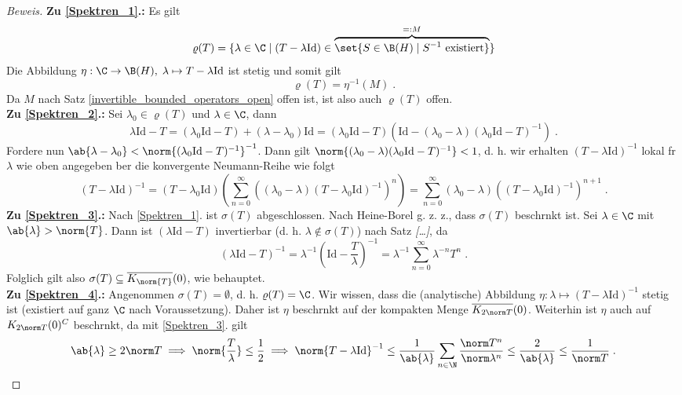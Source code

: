 	\begin{proof}[Beweis]
		\textbf{Zu \ref{Spektren_1}.:} Es gilt
		\[\varrho(T) = \{\lambda \in \C\;\vert\; (T-\lambda \text{Id}) \in \overbrace{\set{S \in \B(H)\;\vert\;S^{-1} \text{ existiert}}}^{=:M}\} \]
		Die Abbildung \(\eta:\C \to \B(H),\; \lambda \mapsto T-\lambda \text{Id}\) ist stetig und somit gilt 
		\[\varrho(T) = \eta^{-1}(M)\;.\]
		Da $M$ nach Satz \ref{invertible_bounded_operators_open} offen ist, ist also auch \(\varrho(T)\) offen.\\
		\textbf{Zu \ref{Spektren_2}.:} Sei \(\lambda_0 \in \varrho(T)\) und \(\lambda \in \C\), dann  
		\[\lambda\text{Id} - T = (\lambda_0\text{Id} -T) + (\lambda - \lambda_0)\text{Id} = (\lambda_0\text{Id}-T)(\text{Id} - (\lambda_0 - \lambda)(\lambda_0 \text{Id}-T)^{-1})\;.\]
		Fordere nun  \(\ab{\lambda - \lambda_0} < \norm{(\lambda_0\text{Id} -T)^{-1}}^{-1}\). Dann gilt \(\norm{(\lambda_0 - \lambda)(\lambda_0\text{Id}-T)^{-1}}< 1\), d. h. wir erhalten \((T-\lambda\text{Id})^{-1}\)  lokal f\us r \(\lambda\) wie oben angegeben \us ber die konvergente Neumann-Reihe wie folgt
		\[(T-\lambda\text{Id})^{-1} = (T-\lambda_0\text{Id})\left(\sum_{n=0}^\infty ((\lambda_0 - \lambda)(T-\lambda_0 \text{Id} )^{-1})^n\right) = \sum_{n=0}^\infty (\lambda_0 - \lambda)((T-\lambda_0 \text{Id} )^{-1})^{n+1}\;.\]
		\textbf{Zu \ref{Spektren_3}.:} Nach \ref{Spektren_1}. ist \(\sigma(T)\) abgeschlossen. Nach Heine-Borel g. z. z., dass \(\sigma(T)\) beschr\as nkt ist. Sei \(\lambda \in \C\) mit \(\ab{\lambda} > \norm{T}\). Dann ist \((\lambda \text{Id} - T)\) invertierbar (d. h. \(\lambda \not\in \sigma(T)\)) nach Satz \textit{[\ldots]}, da
		\[(\lambda\text{Id} - T)^{-1} = \lambda^{-1} \left(\text{Id} -\frac{T}{\lambda}\right)^{-1} = \lambda^{-1} \sum_{n=0}^\infty \lambda^{-n} T^n\;.\]
		Folglich gilt also \(\sigma(T)\subseteq \overline{K_{\norm{T}}}(0)\), wie behauptet. \\
		\textbf{Zu \ref{Spektren_4}.:} Angenommen \(\sigma(T) = \emptyset\), d. h. \(\varrho(T) = \C\). Wir wissen, dass die (analytische) Abbildung \(\eta: \lambda \mapsto (T - \lambda\text{Id})^{-1}\) stetig ist (existiert auf ganz $\C$ nach Voraussetzung). Daher ist $\eta$ beschr\as nkt auf der kompakten Menge \(\overline{K_{2\norm T}}(0)\). Weiterhin ist $\eta$ auch auf \(K_{2\norm T}(0)^C\) beschr\as nkt, da mit \ref{Spektren_3}. gilt 
		\[\ab{\lambda} \geq 2 \norm T \implies \norm{\frac T \lambda} \leq \frac 12 \implies \norm{T-\lambda\text{Id}}^{-1} \leq \frac{1}{\ab{\lambda}}\sum_{n\in\N}\frac{\norm T^n}{\norm \lambda ^n} \leq \frac{2}{\ab{\lambda}} \leq\frac{1}{\norm T}\;. \] 

\end{proof}
